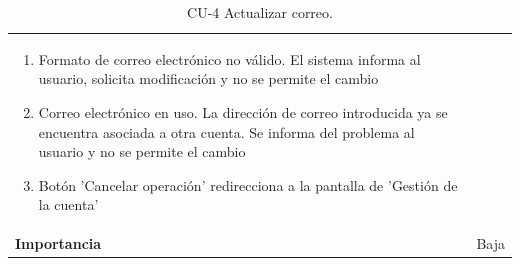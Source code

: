 \begin{table}[p]
\begin{tabularx}{\linewidth}{ p{} p{} }
\begin{enumerate}
                \item Formato de correo electrónico no válido. El sistema informa al usuario, solicita modificación y no se permite el cambio
                \item Correo electrónico en uso. La dirección de correo introducida ya se encuentra asociada a otra cuenta. Se informa del problema al usuario y no se permite el cambio
                \item Botón 'Cancelar operación' redirecciona a la pantalla de 'Gestión de la cuenta'
		\end{enumerate}\\
		\textbf{Importancia}          & Baja \\
		\bottomrule
	\end{tabularx}
	\caption{CU-4 Actualizar correo.}
\end{table}

